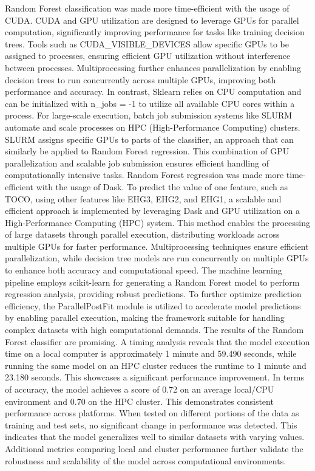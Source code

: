 \documentclass[conference]{IEEEtran}
\begin{document}
Random Forest classification was made more time-efficient with the usage of CUDA. CUDA and GPU utilization are designed to leverage GPUs for parallel computation, significantly improving performance for tasks like training decision trees. Tools such as CUDA\_VISIBLE\_DEVICES allow specific GPUs to be assigned to processes, ensuring efficient GPU utilization without interference between processes. Multiprocessing further enhances parallelization by enabling decision trees to run concurrently across multiple GPUs, improving both performance and accuracy. In contrast, Sklearn relies on CPU computation and can be initialized with n\_jobs = -1 to utilize all available CPU cores within a process. For large-scale execution, batch job submission systems like SLURM automate and scale processes on HPC (High-Performance Computing) clusters. SLURM assigns specific GPUs to parts of the classifier, an approach that can similarly be applied to Random Forest regression. This combination of GPU parallelization and scalable job submission ensures efficient handling of computationally intensive tasks.
Random Forest regression was made more time-efficient with the usage of Dask. To predict the value of one feature, such as TOCO, using other features like EHG3, EHG2, and EHG1, a scalable and efficient approach is implemented by leveraging Dask and GPU utilization on a High-Performance Computing (HPC) system. This method enables the processing of large datasets through parallel execution, distributing workloads across multiple GPUs for faster performance. Multiprocessing techniques ensure efficient parallelization, while decision tree models are run concurrently on multiple GPUs to enhance both accuracy and computational speed. The machine learning pipeline employs scikit-learn for generating a Random Forest model to perform regression analysis, providing robust predictions. To further optimize prediction efficiency, the ParallelPostFit module is utilized to accelerate model predictions by enabling parallel execution, making the framework suitable for handling complex datasets with high computational demands.
The results of the Random Forest classifier are promising. A timing analysis reveals that the model execution time on a local computer is approximately 1 minute and 59.490 seconds, while running the same model on an HPC cluster reduces the runtime to 1 minute and 23.180 seconds. This showcases a significant performance improvement. In terms of accuracy, the model achieves a score of 0.72 on an average local/CPU environment and 0.70 on the HPC cluster. This demonstrates consistent performance across platforms. When tested on different portions of the data as training and test sets, no significant change in performance was detected. This indicates that the model generalizes well to similar datasets with varying values. Additional metrics comparing local and cluster performance further validate the robustness and scalability of the model across computational environments.
\end{document}
